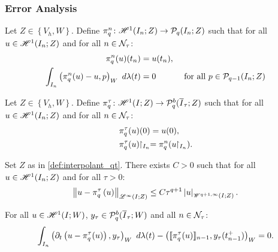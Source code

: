 \newpage
\subsubsection{Error Analysis}

\begin{definition}[$\InterpolantQN$] \label{def:interpolant_qn}
    Let $Z \in \left\{V_h, W\right\}$. Define $\pi^n_q \colon \mathscr{H}^{1}(I_n; Z) \rightarrow \mathcal{P}_{q}(I_n; Z)$ such that for all $u \in \mathscr{H}^{1}(I_n; Z)$ and for all $n \in \mathcal{N}_{\tau}$:
    \begin{align}
        \pi^n_q(u)(t_n) & = u(t_n), \\
        \int_{I_n} \left( \pi^n_q(u) - u, p \right)_W ~ d \lambda(t) &= 0 &\text{ for all } p \in \mathcal{P}_{q - 1}(I_n; Z)
    \end{align}
\end{definition}

\begin{definition}[$\InterpolantQT$] \label{def:interpolant_qt}
    Let $Z \in \left\{V_h, W\right\}$. Define $\pi^{\tau}_q \colon \mathscr{H}^{1}(I; Z) \rightarrow \mathcal{P}_{q}^b(\overline{I}_{\tau}; Z)$ such that for all $u \in \mathscr{H}^{1}(I_n; Z)$ and for all $n \in \mathcal{N}_{\tau}$:
    \begin{align}
        & \pi^{\tau}_q(u)(0) = u(0), \\
        & \pi^{\tau}_q(u) \!\!\restriction_{I_n} = \pi^n_q(u \!\!\restriction_{I_n}).
    \end{align}
\end{definition}

\begin{proposition} \label{prop:interpolant_qt}
    Set $Z$ as in \cref{def:interpolant_qt}. There exists $C > 0$ such that for all $u \in \mathscr{H}^{1}(I_n; Z)$ and for all $\tau > 0$:
    \begin{align}
        \left\lVert  u - \pi^{\tau}_q \left( u \right)  \right\rVert_{\mathscr{L}^{\infty}(I; Z)} \leq C \tau^{q + 1} \left\lvert  u  \right\rvert_{\mathscr{W}^{q + 1, \infty}(I; Z)}.
    \end{align}
\end{proposition}

\begin{lemma}[Orthogonality] \label{lemma:orthogonality}
    For all $u \in \mathscr{H}^{1}(I; W)$, $y_{\tau} \in \mathcal{P}_{q}^b(\overline{I}_{\tau}; W)$ and all $n \in \mathcal{N}_{\tau}$:
    \begin{align}
        \int_{I_n} \left( \partial_t \left( u - \pi^{\tau}_q(u) \right), y_{\tau} \right)_W ~ d \lambda(t) - \left( \llbracket \pi^{\tau}_q(u) \rrbracket_{n - 1}, y_{\tau}(t_{n - 1}^+) \right)_W = 0.
    \end{align}
\end{lemma}

